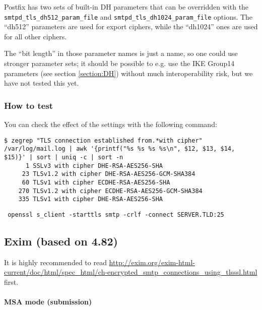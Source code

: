 Postfix has two sets of built-in DH parameters that can be overridden
with the \verb|smtpd_tls_dh512_param_file|
and \verb|smtpd_tls_dh1024_param_file| options. The ``dh512''
parameters are used for export ciphers, while the ``dh1024'' ones are
used for all other ciphers.

The ``bit length'' in those parameter names is just a name, so one
could use stronger parameter sets; it should be possible to e.g. use the
IKE Group14 parameters (see section \ref{section:DH}) without much
interoperability risk, but we have not tested this yet.



\subsubsection{How to test}

You can check the effect of the settings with the following command:
\begin{lstlisting}
$ zegrep "TLS connection established from.*with cipher" /var/log/mail.log | awk '{printf("%s %s %s %s\n", $12, $13, $14, $15)}' | sort | uniq -c | sort -n
      1 SSLv3 with cipher DHE-RSA-AES256-SHA
     23 TLSv1.2 with cipher DHE-RSA-AES256-GCM-SHA384
     60 TLSv1 with cipher ECDHE-RSA-AES256-SHA
    270 TLSv1.2 with cipher ECDHE-RSA-AES256-GCM-SHA384
    335 TLSv1 with cipher DHE-RSA-AES256-SHA
\end{lstlisting}

\begin{lstlisting}
 openssl s_client -starttls smtp -crlf -connect SERVER.TLD:25
\end{lstlisting}


\subsection{Exim (based on 4.82)}

It is highly recommended to read
\url{http://exim.org/exim-html-current/doc/html/spec_html/ch-encrypted_smtp_connections_using_tlsssl.html}
first.

\paragraph*{MSA mode (submission)}\mbox{}\\

